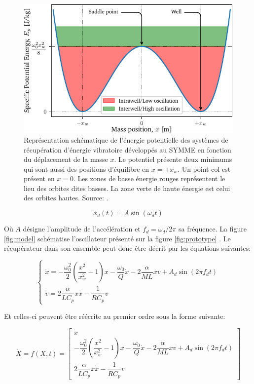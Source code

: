 \documentclass[a4paper, french, 12pt, titlepage]{article}
\begin{document}
\begin{figure}
  \begin{center}
    \includegraphics[width = .6\textwidth]{images/potential}
  \end{center}
  \caption{Représentation schématique de l'énergie potentielle des systèmes de récupération d'énergie vibratoire développés au SYMME en fonction du déplacement de la masse $x$.
    Le potentiel présente deux minimums qui sont aussi des positions d'équilibre en $x = \pm x_w$.
    Un point col est présent en $x = 0$.
    Les zones de basse énergie rouges représentent le lieu des orbites dites basses.
    La zone verte de haute énergie est celui des orbites hautes.  Source:  \cite{lcharleuxHDR}.}
  \label{fig:lc_potential}
\end{figure}

\begin{equation}
  \ddot x_d(t) = A \sin (\omega_d t)
\end{equation}

\noindent Où $A$ désigne l'amplitude de l'accélération et $f_d = \omega_d / 2 \pi$ sa fréquence.
La figure \ref{fig:model} schématise l'oscillateur présenté sur la figure \ref{fig:prototype} \cite{csaintmartin2023preprint}.
Le récupérateur dans son ensemble peut donc être décrit par les équations suivantes:

\begin{equation}
  \left\{
  \begin{array}{ll}
    \ddot{x} = -\dfrac{\omega_0^2}{2} \left( \dfrac{x^2}{x_w^2} - 1 \right) x - \dfrac{\omega_0}{Q} \dot{x} - 2 \dfrac{\alpha}{M L} x v + A_d \sin(2 \pi f_d t) \\[5mm]
    \dot{v} =   2 \dfrac{\alpha}{LC_p} x \dot{x} - \dfrac{1}{R C_p} v
  \end{array}
  \right.
  \label{eq:ode}
\end{equation}

\noindent Et celles-ci peuvent être réécrite au premier ordre sous la forme suivante:

\begin{equation}
  \dot X = f(X, t)
  =
  \begin{bmatrix}
    \dot x                                                                                                                                                       \\
    -\dfrac{\omega_0^2}{2} \left( \dfrac{x^2}{x_w^2} - 1 \right) x - \dfrac{\omega_0}{Q} \dot{x} - 2 \dfrac{\alpha}{M L} x v + A_d \sin \left(2 \pi f_d t\right) \\
    2 \dfrac{\alpha}{LC_p} x \dot{x} - \dfrac{1}{R C_p} v
  \end{bmatrix}
  \label{eq:ode2}
\end{equation}
\end{document}
